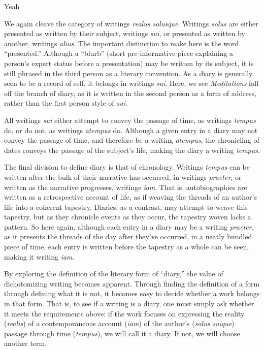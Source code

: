 Yeah \documentclass[12pt]{article}[titlepage]
\newcommand{\say}[1]{``#1''}
\newcommand{\1}{\={a}}
\newcommand{\2}{\={e}}
\newcommand{\3}{\={\i}}
\newcommand{\4}{\=o}
\newcommand{\5}{\=u}
\newcommand{\6}{\={A}}
\renewcommand{\,}{\textsuperscript{,}}
\begin{document}
We again cleave the category of writings \textit{realus solusque}.
Writings \textit{solus} are either presented as written by their subject, writings \textit{sui}, or presented as written by another, writings \textit{alius}.
The important distinction to make here is the word \say{presented.}
Although a \say{blurb} (short pre-informative piece explaining a person's expert status before a presentation) may be written by its subject, it is still phrased in the third person as a literary convention.
As a diary is generally seen to be a record of self, it belongs in writings \textit{sui}.
Here, we see \textit{Meditations} fall off the branch of diary, as it is written in the second person as a form of address, rather than the first person style of \textit{sui}. 

All writings \textit{sui} either attempt to convey the passage of time, as writings \textit{tempus} do, or do not, as writings \textit{atempus} do.
Although a given entry in a diary may not convey the passage of time, and therefore be a writing \textit{atempus}, the chronicling of dates conveys the passage of the subject's life, making the diary a writing \textit{tempus}.

The final division to define diary is that of chronology.
Writings \textit{tempus} can be written after the bulk of their narrative has occurred, in writings \textit{praeter}, or written as the narrative progresses, writings \textit{iam}.
That is, autobiographies are written as a retrospective account of life, as if weaving the threads of an  author's life into a coherent tapestry.
Diaries, as a contrast, may attempt to weave this tapestry, but as they chronicle events as they occur, the tapestry woven lacks a pattern.
So here again, although each entry in a diary may be a writing \textit{praeter}, as it presents the threads of the day after they've occurred, in a neatly bundled piece of time, each entry is written before the tapestry as a whole can be seen, making it writing \textit{iam}.

By exploring the definition of the literary form of \say{diary,} the value of dichotomizing writing becomes apparent.
Through finding the definition of a form through defining what it is not, it becomes easy to decide whether a work belongs in that form.
That is, to see if a writing is a diary, one must simply ask whether it meets the requirements above: if the work focuses on expressing the reality (\textit{realis}) of a contemporaneous account (\textit{iam}) of the author's (\textit{solus suique}) passage through time (\textit{tempus}), we will call it a diary.
If not, we will choose another term.
\end{document}
